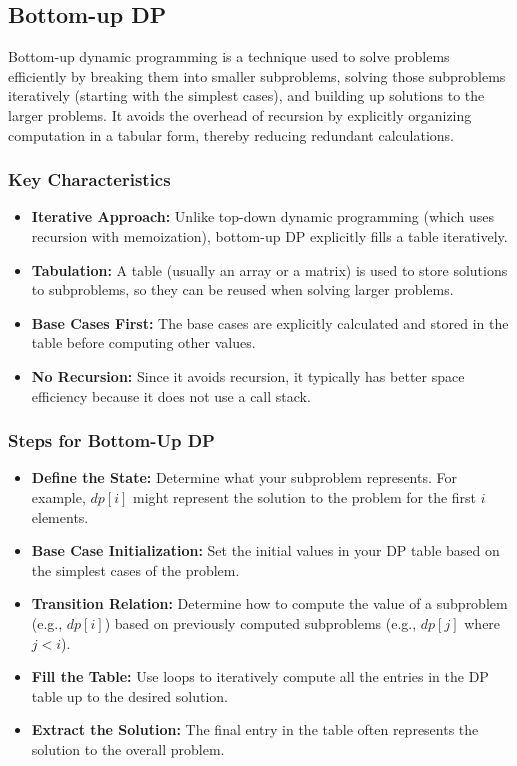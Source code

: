 \documentclass{report}
\begin{document}
\subsection{Bottom-up DP}
\bigbreak \noindent 
Bottom-up dynamic programming is a technique used to solve problems efficiently by breaking them into smaller subproblems, solving those subproblems iteratively (starting with the simplest cases), and building up solutions to the larger problems. It avoids the overhead of recursion by explicitly organizing computation in a tabular form, thereby reducing redundant calculations.
\bigbreak \noindent 
\subsubsection{Key Characteristics}
\bigbreak \noindent 
\begin{itemize}
    \item \textbf{Iterative Approach:} Unlike top-down dynamic programming (which uses recursion with memoization), bottom-up DP explicitly fills a table iteratively.
    \item \textbf{Tabulation:} A table (usually an array or a matrix) is used to store solutions to subproblems, so they can be reused when solving larger problems.
    \item \textbf{Base Cases First:} The base cases are explicitly calculated and stored in the table before computing other values.
    \item \textbf{No Recursion:} Since it avoids recursion, it typically has better space efficiency because it does not use a call stack.
\end{itemize}
\bigbreak \noindent 
\subsubsection{Steps for Bottom-Up DP}
\bigbreak \noindent 
\begin{itemize}
    \item \textbf{Define the State:} Determine what your subproblem represents. For example, $dp[i]$ might represent the solution to the problem for the first $i$ elements.
    \item \textbf{Base Case Initialization:} Set the initial values in your DP table based on the simplest cases of the problem.
    \item \textbf{Transition Relation:} Determine how to compute the value of a subproblem (e.g., $dp[i]$) based on previously computed subproblems (e.g., $dp[j]$ where $j<i$).
    \item \textbf{Fill the Table:} Use loops to iteratively compute all the entries in the DP table up to the desired solution.
    \item \textbf{Extract the Solution:} The final entry in the table often represents the solution to the overall problem.
\end{itemize}
\end{document}
